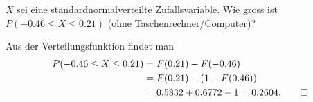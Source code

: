 $X$ sei eine standardnormalverteilte Zufallsvariable. Wie gross
ist $P(-0.46\le X\le 0.21)$ (ohne Taschenrechner/Computer)?

\begin{loesung}
Aus der Verteilungsfunktion findet man
\begin{align*}
P(-0.46\le X\le 0.21)
&=F(0.21)-F(-0.46)
\\
&=F(0.21)-(1-F(0.46))
\\
&=0.5832+0.6772-1=0.2604.
\qedhere
\end{align*}
\end{loesung}

